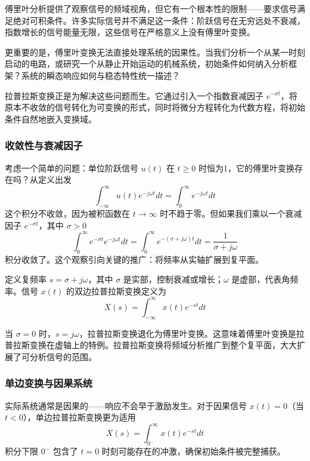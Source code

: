 傅里叶分析提供了观察信号的频域视角，但它有一个根本性的限制——要求信号满足绝对可积条件。许多实际信号并不满足这一条件：阶跃信号在无穷远处不衰减，指数增长的信号能量无限，这些信号在严格意义上没有傅里叶变换。

更重要的是，傅里叶变换无法直接处理系统的因果性。当我们分析一个从某一时刻启动的电路，或研究一个从静止开始运动的机械系统，初始条件如何纳入分析框架？系统的瞬态响应如何与稳态特性统一描述？

拉普拉斯变换正是为解决这些问题而生。它通过引入一个指数衰减因子 $e^{-\sigma t}$，将原本不收敛的信号转化为可变换的形式，同时将微分方程转化为代数方程，将初始条件自然地嵌入变换域。

\subsubsection{收敛性与衰减因子}

考虑一个简单的问题：单位阶跃信号 $u(t)$ 在 $t \geq 0$ 时恒为1，它的傅里叶变换存在吗？从定义出发
\begin{equation}
    \int_{-\infty}^{\infty} u(t) e^{-j\omega t} dt = \int_{0}^{\infty} e^{-j\omega t} dt
\end{equation}
这个积分不收敛，因为被积函数在 $t \to \infty$ 时不趋于零。但如果我们乘以一个衰减因子 $e^{-\sigma t}$，其中 $\sigma > 0$
\begin{equation}
    \int_{0}^{\infty} e^{-\sigma t} e^{-j\omega t} dt = \int_{0}^{\infty} e^{-(\sigma + j\omega)t} dt = \frac{1}{\sigma + j\omega}
\end{equation}
积分收敛了。这个观察引向关键的推广：将频率从实轴扩展到复平面。

定义复频率 $s = \sigma + j\omega$，其中 $\sigma$ 是实部，控制衰减或增长；$\omega$ 是虚部，代表角频率。信号 $x(t)$ 的双边拉普拉斯变换定义为
\begin{equation}
    X(s) = \int_{-\infty}^{\infty} x(t) e^{-st} dt
\end{equation}

当 $\sigma = 0$ 时，$s = j\omega$，拉普拉斯变换退化为傅里叶变换。这意味着傅里叶变换是拉普拉斯变换在虚轴上的特例。拉普拉斯变换将频域分析推广到整个复平面，大大扩展了可分析信号的范围。

\subsubsection{单边变换与因果系统}

实际系统通常是因果的——响应不会早于激励发生。对于因果信号 $x(t) = 0$（当 $t < 0$），单边拉普拉斯变换更为适用
\begin{equation}
    X(s) = \int_{0^-}^{\infty} x(t) e^{-st} dt
\end{equation}
积分下限 $0^-$ 包含了 $t=0$ 时刻可能存在的冲激，确保初始条件被完整捕获。


